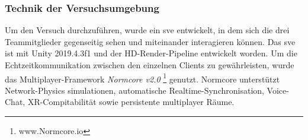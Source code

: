 \documentclass[a4paper,11pt]{article}%
\renewcommand{\\}{\vspace*{0.5\baselineskip} \newline}
\begin{document}
%

\subsubsection{Technik der Versuchsumgebung}
Um den Versuch durchzuführen, wurde ein \ac{sve} entwickelt, in dem sich die drei Teammitglieder gegenseitig sehen und miteinander interagieren können. Das \ac{sve} ist mit Unity 2019.4.3f1 und der HD-Render-Pipeline entwickelt worden. Um die Echtzeitkommunikation zwischen den einzelnen Clients zu gewährleisten, wurde das Multiplayer-Framework \textit{Normcore v2.0} \footnote{www.Normcore.io} genutzt.
Normcore unterstützt Network-Physics simulationen, automatische Realtime-Synchronisation, Voice-Chat, XR-Compitabilität sowie persistente multiplayer Räume.	
\end{document}
